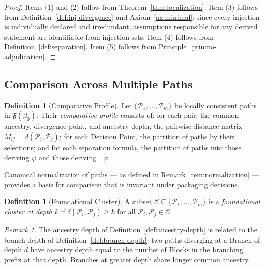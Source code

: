 \documentclass[12pt, a4paper]{article}
\theoremstyle{plain}
\theoremstyle{definition}
\newtheorem{definition}[theorem]{Definition}
\theoremstyle{remark}
\newtheorem{remark}[theorem]{Remark}
\newcommand{\FS}[1]{\mathfrak{F}(#1)}
\begin{document}
\begin{proof}
Items (1) and (2) follow from Theorem~\ref{thm:localization}. Item
(3) follows from Definition~\ref{def:inj-divergence} and
Axiom~\ref{ax:minimal}: since every injection is individually
declared and irredundant, assumptions responsible for any derived
statement are identifiable from injection sets. Item (4) follows
from Definition~\ref{def:separation}. Item (5) follows from
Principle~\ref{prin:no-adjudication}.
\end{proof}

\subsection{Comparison Across Multiple Paths}
\label{subsec:comparison-multi}

\begin{definition}[Comparative Profile]
\label{def:comparative-profile}
Let $\{\mathcal{P}_1,\ldots,\mathcal{P}_m\}$ be locally consistent
paths in $\FS{\beta_0}$. Their \emph{comparative profile} consists of:
for each pair, the common ancestry, divergence point, and ancestry
depth; the pairwise distance matrix $M_{ij} = d(\mathcal{P}_i,
\mathcal{P}_j)$; for each Decision Point, the partition of paths by
their selections; and for each separation formula, the partition of
paths into those deriving $\varphi$ and those deriving $\neg\varphi$.

Canonical normalization of paths --- as defined in
Remark~\ref{rem:normalization} --- provides a basis for comparison
that is invariant under packaging decisions.
\end{definition}

\begin{definition}[Foundational Cluster]
\label{def:cluster}
A subset $\mathcal{C} \subseteq \{\mathcal{P}_1,\ldots,\mathcal{P}_m\}$
is a \emph{foundational cluster at depth $k$} if
$\delta(\mathcal{P}_i,\mathcal{P}_j) \geq k$ for all
$\mathcal{P}_i,\mathcal{P}_j \in \mathcal{C}$.
\end{definition}

\begin{remark}
The ancestry depth of Definition~\ref{def:ancestry-depth} is related
to the branch depth of Definition~\ref{def:branch-depth}: two paths
diverging at a Branch of depth $d$ have ancestry depth equal to the
number of Blocks in the branching prefix at that depth. Branches at
greater depth share longer common ancestry.
\end{remark}
\end{document}
